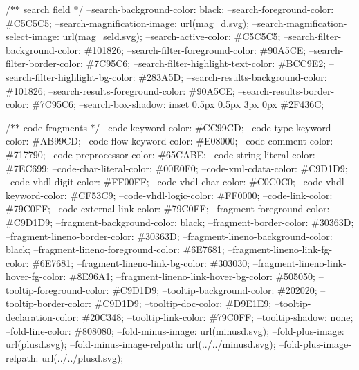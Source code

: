 /\texorpdfstring{$\ast$}{*}\texorpdfstring{$\ast$}{*} search field \texorpdfstring{$\ast$}{*}/ --search-\/background-\/color\+: black; --search-\/foreground-\/color\+: \#\+C5\+C5\+C5; --search-\/magnification-\/image\+: url(\textquotesingle{}mag\+\_\+d.\+svg\textquotesingle{}); --search-\/magnification-\/select-\/image\+: url(\textquotesingle{}mag\+\_\+seld.\+svg\textquotesingle{}); --search-\/active-\/color\+: \#\+C5\+C5\+C5; --search-\/filter-\/background-\/color\+: \#101826; --search-\/filter-\/foreground-\/color\+: \#90A5\+CE; --search-\/filter-\/border-\/color\+: \#7C95\+C6; --search-\/filter-\/highlight-\/text-\/color\+: \#\+BCC9\+E2; --search-\/filter-\/highlight-\/bg-\/color\+: \#283A5D; --search-\/results-\/background-\/color\+: \#101826; --search-\/results-\/foreground-\/color\+: \#90A5\+CE; --search-\/results-\/border-\/color\+: \#7C95\+C6; --search-\/box-\/shadow\+: inset 0.\+5px 0.\+5px 3px 0px \#2F436C;

/\texorpdfstring{$\ast$}{*}\texorpdfstring{$\ast$}{*} code fragments \texorpdfstring{$\ast$}{*}/ --code-\/keyword-\/color\+: \#\+CC99\+CD; --code-\/type-\/keyword-\/color\+: \#\+AB99\+CD; --code-\/flow-\/keyword-\/color\+: \#\+E08000; --code-\/comment-\/color\+: \#717790; --code-\/preprocessor-\/color\+: \#65CABE; --code-\/string-\/literal-\/color\+: \#7EC699; --code-\/char-\/literal-\/color\+: \#00E0\+F0; --code-\/xml-\/cdata-\/color\+: \#\+C9\+D1\+D9; --code-\/vhdl-\/digit-\/color\+: \#\+FF00\+FF; --code-\/vhdl-\/char-\/color\+: \#\+C0\+C0\+C0; --code-\/vhdl-\/keyword-\/color\+: \#\+CF53\+C9; --code-\/vhdl-\/logic-\/color\+: \#\+FF0000; --code-\/link-\/color\+: \#79C0\+FF; --code-\/external-\/link-\/color\+: \#79C0\+FF; --fragment-\/foreground-\/color\+: \#\+C9\+D1\+D9; --fragment-\/background-\/color\+: black; --fragment-\/border-\/color\+: \#30363D; --fragment-\/lineno-\/border-\/color\+: \#30363D; --fragment-\/lineno-\/background-\/color\+: black; --fragment-\/lineno-\/foreground-\/color\+: \#6E7681; --fragment-\/lineno-\/link-\/fg-\/color\+: \#6E7681; --fragment-\/lineno-\/link-\/bg-\/color\+: \#303030; --fragment-\/lineno-\/link-\/hover-\/fg-\/color\+: \#8E96\+A1; --fragment-\/lineno-\/link-\/hover-\/bg-\/color\+: \#505050; --tooltip-\/foreground-\/color\+: \#\+C9\+D1\+D9; --tooltip-\/background-\/color\+: \#202020; --tooltip-\/border-\/color\+: \#\+C9\+D1\+D9; --tooltip-\/doc-\/color\+: \#\+D9\+E1\+E9; --tooltip-\/declaration-\/color\+: \#20C348; --tooltip-\/link-\/color\+: \#79C0\+FF; --tooltip-\/shadow\+: none; --fold-\/line-\/color\+: \#808080; --fold-\/minus-\/image\+: url(\textquotesingle{}minusd.\+svg\textquotesingle{}); --fold-\/plus-\/image\+: url(\textquotesingle{}plusd.\+svg\textquotesingle{}); --fold-\/minus-\/image-\/relpath\+: url(\textquotesingle{}../../minusd.svg\textquotesingle{}); --fold-\/plus-\/image-\/relpath\+: url(\textquotesingle{}../../plusd.svg\textquotesingle{});

